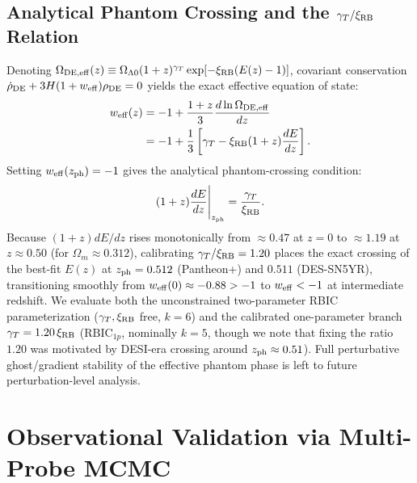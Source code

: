 \documentclass[preprint,12pt]{elsarticle}
\begin{document}
\subsection{Analytical Phantom Crossing and the $\gamma_T / \xi_{\rm RB}$ Relation}
Denoting $\Omega_{\rm DE,eff}(z) \equiv \Omega_{\Lambda 0}(1+z)^{\gamma_T}\exp[-\xi_{\rm RB}(E(z)-1)]$, covariant conservation $\dot{\rho}_{\rm DE} + 3H(1+w_{\rm eff})\rho_{\rm DE} = 0$ yields the exact effective equation of state:
\begin{align}
    w_{\rm eff}(z) &= -1 + \frac{1+z}{3}\frac{d\ln \Omega_{\rm DE,eff}}{dz} \nonumber \\
                   &= -1 + \frac{1}{3}\left[\gamma_T - \xi_{\rm RB}(1+z)\frac{dE}{dz}\right].
    \label{eq:weff_rbic}
\end{align}
Setting $w_{\rm eff}(z_{\rm ph}) = -1$ gives the analytical phantom-crossing condition:
\begin{equation}
    (1+z)\frac{dE}{dz}\Bigg|_{z_{\rm ph}} = \frac{\gamma_T}{\xi_{\rm RB}}.
    \label{eq:phantom_crossing}
\end{equation}
Because $(1+z)dE/dz$ rises monotonically from $\approx 0.47$ at $z=0$ to $\approx 1.19$ at $z \approx 0.50$ (for $\Omega_m \approx 0.312$), calibrating $\gamma_T / \xi_{\rm RB} = 1.20$ places the exact crossing of the best-fit $E(z)$ at $z_{\rm ph} = 0.512$ (Pantheon+) and $0.511$ (DES-SN5YR), transitioning smoothly from $w_{\rm eff}(0) \approx -0.88 > -1$ to $w_{\rm eff} < -1$ at intermediate redshift. We evaluate both the unconstrained two-parameter RBIC parameterization ($\gamma_T, \xi_{\rm RB}$ free, $k=6$) and the calibrated one-parameter branch $\gamma_T = 1.20\,\xi_{\rm RB}$ ($\mathrm{RBIC}_{1p}$, nominally $k=5$, though we note that fixing the ratio $1.20$ was motivated by DESI-era crossing around $z_{\rm ph} \approx 0.51$). Full perturbative ghost/gradient stability of the effective phantom phase is left to future perturbation-level analysis.

\section{Observational Validation via Multi-Probe MCMC}
\label{sec:mcmc}
\end{document}
